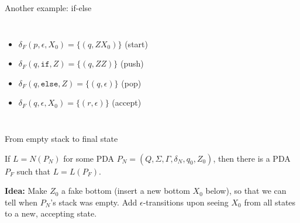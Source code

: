 \documentclass[handout]{beamer}
\begin{document}
\begin{frame}{Another example: if-else}
\begin{columns}
        
        \begin{itemize}
            \item[] $\delta_F(p,\epsilon,X_0)=\{(q,ZX_0)\}$ \hfill (start)
            \item[] $\delta_F(q,\mathtt{if},Z)=\{(q,ZZ)\}$ \hfill (push)
            \item[] $\delta_F(q,\mathtt{else},Z)=\{(q,\epsilon)\}$ \hfill (pop)
            \item[] $\delta_F(q,\epsilon,X_0)=\{(r,\epsilon)\}$ \hfill (accept)
        \end{itemize}
        
    \end{columns}

\end{frame}


\begin{frame}{From empty stack to final state}

    \begin{lemma}
        If $L=N(P_N)$ for some PDA $P_N=(Q,\Sigma,\Gamma,\delta_N,q_0,Z_0)$, then there is a PDA $P_F$ such that $L=L(P_F)$.
    \end{lemma}

    \begin{center}
    \end{center}

    \textbf{Idea:} Make $Z_0$ a fake bottom (insert a new bottom $X_0$ below), so that we can tell when $P_N$'s stack was empty. Add $\epsilon$-transitions upon seeing $X_0$ from all states to a new, accepting state.

\end{frame}
\end{document}
